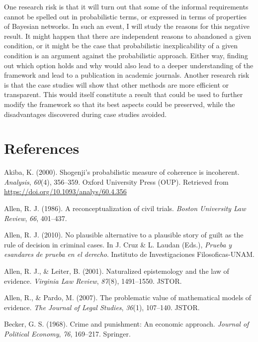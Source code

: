 \documentclass[11pt,dvipsnames,enabledeprecatedfontcommands]{scrartcl}
\begin{document}
One research risk is that it will turn out that some of the informal
requirements cannot be spelled out in probabilistic terms, or expressed
in terms of properties of Bayesian networks. In such an event, I will
study the reasons for this negative result. It might happen that there
are independent reasons to abandoned a given condition, or it might be
the case that probabilistic inexplicability of a given condition is an
argument against the probabilistic approach. Either way, finding out
which option holds and why would also lead to a deeper understanding of
the framework and lead to a publication in academic journals. Another
research risk is that the case studies will show that other methods are
more efficient or transparent. This would itself constitute a result
that could be used to further modify the framework so that its best
aspects could be preserved, while the disadvantages discovered during
case studies avoided.

\section{References}\label{references}

\footnotesize 

\hypertarget{refs}{}
\hypertarget{ref-Akiba2000Shogenjis}{}
Akiba, K. (2000). Shogenji's probabilistic measure of coherence is
incoherent. \emph{Analysis}, \emph{60}(4), 356--359. Oxford University
Press (OUP). Retrieved from
\url{https://doi.org/10.1093/analys/60.4.356}

\hypertarget{ref-Allen1986A-Reconceptuali}{}
Allen, R. J. (1986). A reconceptualization of civil trials. \emph{Boston
University Law Review}, \emph{66}, 401--437.

\hypertarget{ref-Allen2010No-Plausible-Al}{}
Allen, R. J. (2010). No plausible alternative to a plausible story of
guilt as the rule of decision in criminal cases. In J. Cruz \& L. Laudan
(Eds.), \emph{Prueba y esandares de prueba en el derecho}. Instituto de
Investigaciones Filosoficas-UNAM.

\hypertarget{ref-allen2001naturalized}{}
Allen, R. J., \& Leiter, B. (2001). Naturalized epistemology and the law
of evidence. \emph{Virginia Law Review}, \emph{87}(8), 1491--1550.
JSTOR.

\hypertarget{ref-allen2007problematic}{}
Allen, R., \& Pardo, M. (2007). The problematic value of mathematical
models of evidence. \emph{The Journal of Legal Studies}, \emph{36}(1),
107--140. JSTOR.

\hypertarget{ref-becker1968crime}{}
Becker, G. S. (1968). Crime and punishment: An economic approach.
\emph{Journal of Political Economy}, \emph{76}, 169--217. Springer.
\end{document}

